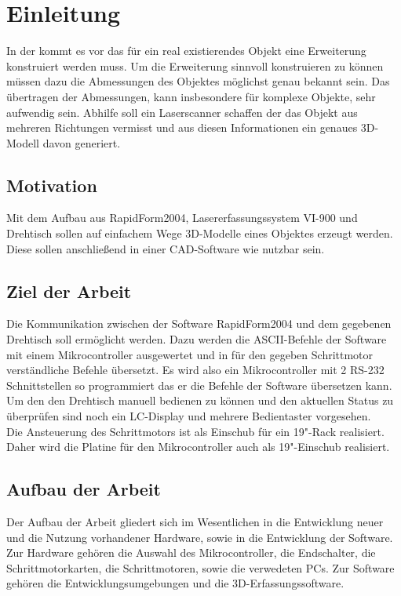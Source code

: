 \chapter{Einleitung}
\label{cha:Einleitung}

In der   kommt es vor das für ein real existierendes Objekt eine Erweiterung konstruiert werden muss. Um die Erweiterung sinnvoll konstruieren zu können müssen dazu die Abmessungen des Objektes möglichst genau bekannt sein. Das übertragen der Abmessungen, kann insbesondere für komplexe Objekte, sehr aufwendig sein.
Abhilfe soll ein Laserscanner schaffen der das Objekt aus mehreren Richtungen vermisst und aus diesen Informationen ein genaues 3D-Modell davon generiert. 

\section{Motivation}
\label{sec:Motivation}
Mit dem Aufbau aus RapidForm2004, Lasererfassungssystem VI-900 und Drehtisch sollen auf einfachem Wege 3D-Modelle eines Objektes erzeugt werden. Diese sollen anschließend in einer CAD-Software wie  nutzbar sein.

\section{Ziel der Arbeit}
\label{sec:ZielDerArbeit}
Die Kommunikation zwischen der Software RapidForm2004 und dem gegebenen Drehtisch soll ermöglicht werden. Dazu werden die ASCII-Befehle der Software mit einem Mikrocontroller ausgewertet und in für den gegeben Schrittmotor verständliche Befehle übersetzt.
Es wird also ein Mikrocontroller mit 2 RS-232 Schnittstellen so programmiert das er die Befehle der Software übersetzen kann. Um den den Drehtisch manuell bedienen zu können und den aktuellen Status zu überprüfen sind noch ein LC-Display und mehrere Bedientaster vorgesehen.\\
Die Ansteuerung des Schrittmotors ist als Einschub für ein 19"-Rack realisiert. Daher wird die Platine für den Mikrocontroller auch als 19"-Einschub realisiert.


\section{Aufbau der Arbeit}
\label{sec:AufbauDerArbeit}
Der Aufbau der Arbeit gliedert sich im Wesentlichen in die Entwicklung neuer und die Nutzung vorhandener Hardware, sowie in die Entwicklung der Software. \\
Zur Hardware gehören die Auswahl des Mikrocontroller, die Endschalter, die Schrittmotorkarten, die Schrittmotoren, sowie die verwedeten PCs.
Zur Software gehören die Entwicklungsumgebungen und die 3D-Erfassungssoftware.

